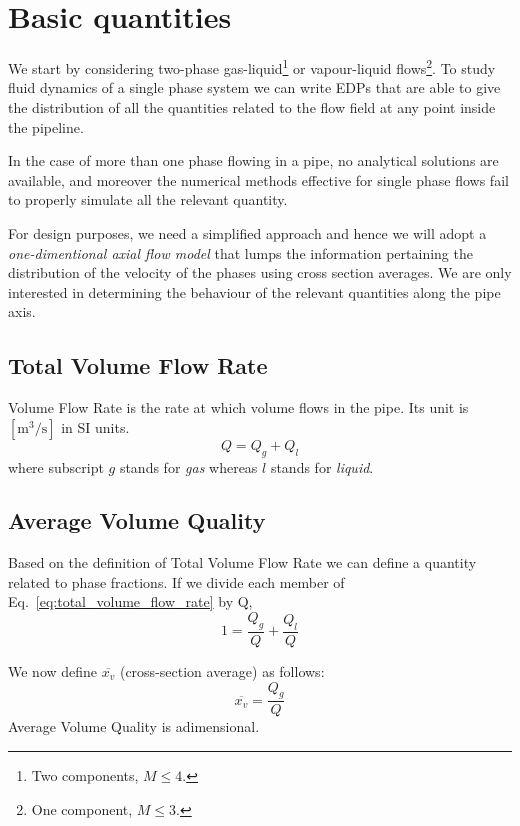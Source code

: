 \section{Basic quantities}
We start by considering two-phase gas-liquid\footnote{Two components, $M \le
4$.} or vapour-liquid flows\footnote{One component, $M \le 3$.}. To study fluid
dynamics of a single phase system we can write EDPs that are able to give the
distribution of all the quantities related to the flow field at any point inside
the pipeline.

In the case of more than one phase flowing in a pipe, no analytical solutions
are available, and moreover the numerical methods effective for single phase
flows fail to properly simulate all the relevant quantity.

For design purposes, we need a simplified approach and hence we will adopt a
\emph{one-dimentional axial flow model} that lumps the information pertaining
the distribution of the velocity of the phases using cross section averages. We
are only interested in determining the behaviour of the relevant quantities
along the pipe axis.

\subsection{Total Volume Flow Rate}
Volume Flow Rate is the rate at which volume flows in the pipe. Its unit is
$[\si{\cubic\metre\per\second}]$ in SI units.
\begin{equation}
    Q = Q_g + Q_l
    \label{eq:total_volume_flow_rate}
\end{equation}
where subscript $g$ stands for \emph{gas} whereas $l$ stands for \emph{liquid}.

\subsection{Average Volume Quality}
Based on the definition of Total Volume Flow Rate we can define a quantity
related to phase fractions. If we divide each member of
Eq.~\ref{eq:total_volume_flow_rate} by Q,
\begin{equation*}
    1 = \frac{Q_g}{Q} + \frac{Q_l}{Q}
\end{equation*}

We now define $\overline{x_v}$ (cross-section average) as follows:
\begin{equation*}
    \overline{x_v} = \frac{Q_g}{Q}
\end{equation*}
Average Volume Quality is adimensional.

